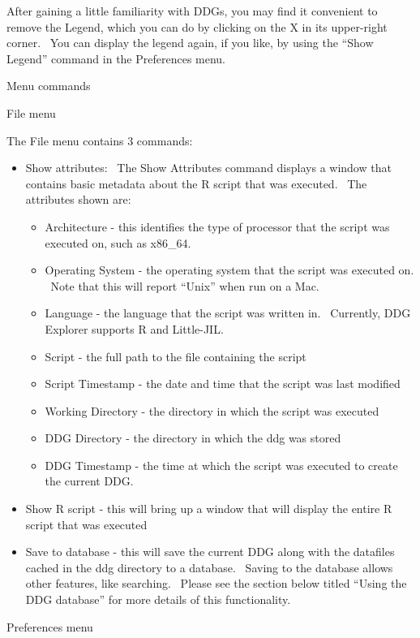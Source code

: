 \documentclass[letterpaper]{article}
\newcommand\liststyleWWviiiNumii{%
\renewcommand\labelitemi{•}
\renewcommand\labelitemii{•}
\renewcommand\labelitemiii{•}
\renewcommand\labelitemiv{•}
}
\begin{document}
{\mdseries\upshape\color{black}
After gaining a little familiarity with DDGs, you may find it convenient to remove the Legend, which you can do by clicking on the X in its upper-right corner. \ You can display the legend again, if you like, by using the “Show Legend” command in the Preferences menu.}

{\color{black}
Menu commands}

{\color{black}
File menu}

{\mdseries\upshape\color{black}
The File menu contains 3 commands:}

\liststyleWWviiiNumii
\begin{itemize}
\item {\color{black}
Show attributes: \ The Show Attributes command displays a window that contains basic metadata about the R script that was executed. \ The attributes shown are:}

\begin{itemize}
\item {\color{black}
Architecture - this identifies the type of processor that the script was executed on, such as x86\_64.}
\item {\color{black}
Operating System - the operating system that the script was executed on. \ Note that this will report “Unix” when run on a Mac.}
\item {\color{black}
Language - the language that the script was written in. \ Currently, DDG Explorer supports R and Little-JIL.}
\item {\color{black}
Script - the full path to the file containing the script}
\item {\color{black}
Script Timestamp - the date and time that the script was last modified}
\item {\color{black}
Working Directory - the directory in which the script was executed}
\item {\color{black}
DDG Directory - the directory in which the ddg was stored}
\item {\color{black}
DDG Timestamp - the time at which the script was executed to create the current DDG.}
\end{itemize}
\item {\color{black}
Show R script - this will bring up a window that will display the entire R script that was executed}
\item {\color{black}
Save to database - this will save the current DDG along with the datafiles cached in the ddg directory to a database. \ Saving to the database allows other features, like searching. \ Please see the section below titled “Using the DDG database” for more details of this functionality.}
\end{itemize}
{\color{black}
Preferences menu}
\end{document}
